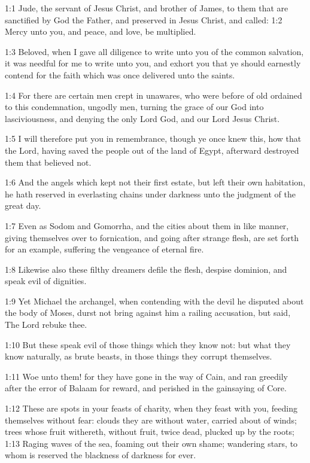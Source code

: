 

1:1 Jude, the servant of Jesus Christ, and brother of James, to them
that are sanctified by God the Father, and preserved in Jesus Christ,
and called: 1:2 Mercy unto you, and peace, and love, be multiplied.

1:3 Beloved, when I gave all diligence to write unto you of the common
salvation, it was needful for me to write unto you, and exhort you
that ye should earnestly contend for the faith which was once
delivered unto the saints.

1:4 For there are certain men crept in unawares, who were before of
old ordained to this condemnation, ungodly men, turning the grace of
our God into lasciviousness, and denying the only Lord God, and our
Lord Jesus Christ.

1:5 I will therefore put you in remembrance, though ye once knew this,
how that the Lord, having saved the people out of the land of Egypt,
afterward destroyed them that believed not.

1:6 And the angels which kept not their first estate, but left their
own habitation, he hath reserved in everlasting chains under darkness
unto the judgment of the great day.

1:7 Even as Sodom and Gomorrha, and the cities about them in like
manner, giving themselves over to fornication, and going after strange
flesh, are set forth for an example, suffering the vengeance of
eternal fire.

1:8 Likewise also these filthy dreamers defile the flesh, despise
dominion, and speak evil of dignities.

1:9 Yet Michael the archangel, when contending with the devil he
disputed about the body of Moses, durst not bring against him a
railing accusation, but said, The Lord rebuke thee.

1:10 But these speak evil of those things which they know not: but
what they know naturally, as brute beasts, in those things they
corrupt themselves.

1:11 Woe unto them! for they have gone in the way of Cain, and ran
greedily after the error of Balaam for reward, and perished in the
gainsaying of Core.

1:12 These are spots in your feasts of charity, when they feast with
you, feeding themselves without fear: clouds they are without water,
carried about of winds; trees whose fruit withereth, without fruit,
twice dead, plucked up by the roots; 1:13 Raging waves of the sea,
foaming out their own shame; wandering stars, to whom is reserved the
blackness of darkness for ever.

